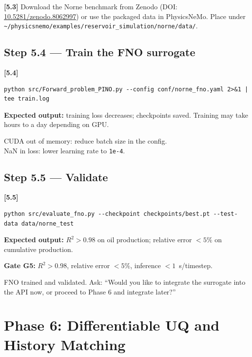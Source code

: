 \documentclass[10pt,a4paper]{article}
\newcommand{\stepID}[1]{\textsf{\textbf{[#1]}}}
\newcommand{\cmd}[1]{\texttt{#1}}
\newcommand{\file}[1]{\texttt{#1}}
\begin{document}
\stepID{5.3} Download the Norne benchmark from Zenodo (DOI: \url{10.5281/zenodo.8062997}) or use the packaged data in PhysicsNeMo. Place under \file{\textasciitilde/physicsnemo/examples/reservoir\_simulation/norne/data/}.

\subsection{Step 5.4 --- Train the FNO surrogate}

\stepID{5.4}
\begin{lstlisting}[style=sh]
python src/Forward_problem_PINO.py --config conf/norne_fno.yaml 2>&1 | tee train.log
\end{lstlisting}

\textbf{Expected output:} training loss decreases; checkpoints saved. Training may take hours to a day depending on GPU.

\begin{failure}
CUDA out of memory: reduce batch size in the config.\\
NaN in loss: lower learning rate to \cmd{1e-4}.
\end{failure}

\subsection{Step 5.5 --- Validate}

\stepID{5.5}
\begin{lstlisting}[style=sh]
python src/evaluate_fno.py --checkpoint checkpoints/best.pt --test-data data/norne_test
\end{lstlisting}

\textbf{Expected output:} $R^2 > 0.98$ on oil production; relative error $<5\%$ on cumulative production.

\begin{gate}
\textbf{Gate G5:} $R^2 > 0.98$, relative error $<5\%$, inference $<1$~s/timestep.
\end{gate}

\begin{aicheckpoint}
FNO trained and validated. Ask: ``Would you like to integrate the surrogate into the API now, or proceed to Phase 6 and integrate later?''
\end{aicheckpoint}

\section{Phase 6: Differentiable UQ and History Matching}
\label{sec:phase6}
\end{document}

